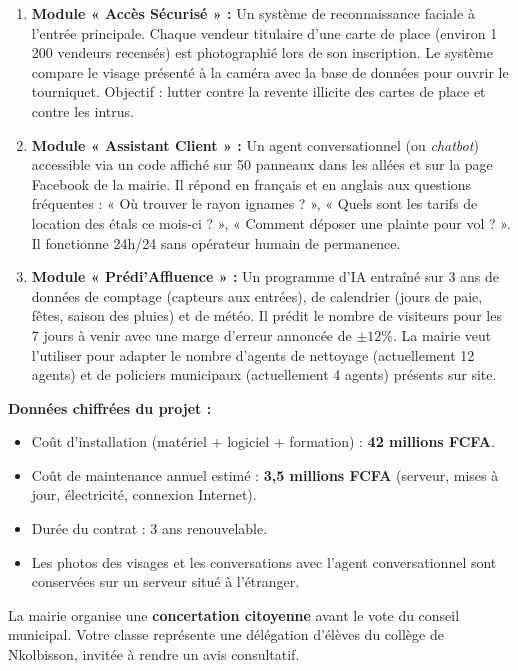 \documentclass[11pt]{article}
\newcommand{\cle}[1]{{\popxbold\color{popdark}#1}}
\begin{document}
\begin{enumerate}
    \item \textbf{Module « Accès Sécurisé » :} Un système de \cle{reconnaissance faciale} à l'entrée principale. Chaque vendeur titulaire d'une carte de place (environ 1\,200 vendeurs recensés) est photographié lors de son inscription. Le système compare le visage présenté à la caméra avec la base de données pour ouvrir le tourniquet. Objectif : lutter contre la revente illicite des cartes de place et contre les intrus.
    \item \textbf{Module « Assistant Client » :} Un \cle{agent conversationnel} (ou \emph{chatbot}) accessible via un code affiché sur 50 panneaux dans les allées et sur la page Facebook de la mairie. Il répond en français et en anglais aux questions fréquentes : « Où trouver le rayon ignames ? », « Quels sont les tarifs de location des étals ce mois-ci ? », « Comment déposer une plainte pour vol ? ». Il fonctionne 24h/24 sans opérateur humain de permanence.
    \item \textbf{Module « Prédi'Affluence » :} Un programme d'IA entraîné sur 3 ans de données de comptage (capteurs aux entrées), de calendrier (jours de paie, fêtes, saison des pluies) et de météo. Il prédit le nombre de visiteurs pour les 7 jours à venir avec une marge d'erreur annoncée de $\pm 12\%$. La mairie veut l'utiliser pour adapter le nombre d'agents de nettoyage (actuellement 12 agents) et de policiers municipaux (actuellement 4 agents) présents sur site.
\end{enumerate}

\textbf{Données chiffrées du projet :}
\begin{itemize}
    \item Coût d'installation (matériel + logiciel + formation) : \textbf{42 millions FCFA}.
    \item Coût de maintenance annuel estimé : \textbf{3,5 millions FCFA} (serveur, mises à jour, électricité, connexion Internet).
    \item Durée du contrat : 3 ans renouvelable.
    \item Les photos des visages et les conversations avec l'agent conversationnel sont conservées sur un serveur situé à l'étranger.
\end{itemize}

La mairie organise une \textbf{concertation citoyenne} avant le vote du conseil municipal. Votre classe représente une délégation d'élèves du collège de Nkolbisson, invitée à rendre un avis consultatif.
\end{document}
